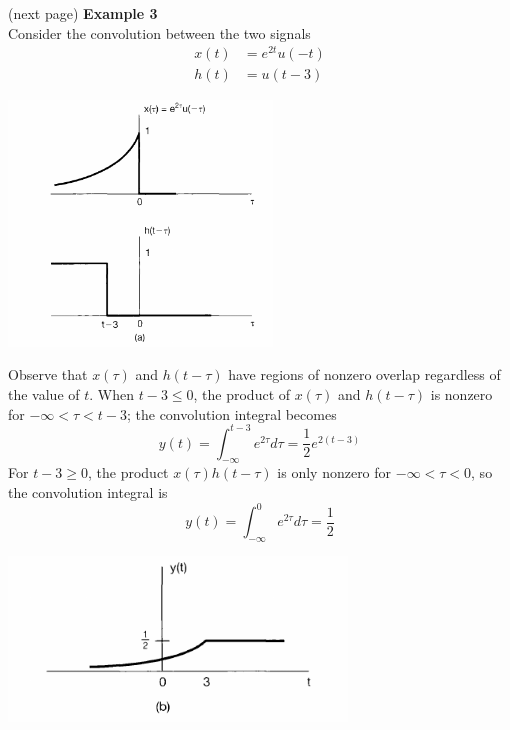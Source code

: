\documentclass{report}
\begin{document}
(next page)\newpage
\noindent\textbf{Example 3}\\
Consider the convolution between the two signals
\begin{align*}
x(t)&=e^{2t}u(-t)\\
h(t)&=u(t-3)
\end{align*}
\begin{center}
\includegraphics[width=7cm]{a41}
\end{center}
Observe that $x(\tau)$ and $h(t-\tau)$ have regions of nonzero overlap regardless of the value of $t$. 
When $t-3\leq0$, the product of $x(\tau)$ and $h(t-\tau)$ is nonzero for $-\infty<\tau<t-3$; the convolution integral becomes
\begin{equation*}
y(t)=\int^{t-3}_{-\infty}e^{2\tau}d\tau=\frac{1}{2}e^{2(t-3)}
\end{equation*}
For $t-3\geq0$, the product $x(\tau)h(t-\tau)$ is only nonzero for $-\infty<\tau<0$, so the convolution integral is
\begin{equation*}
y(t)=\int^0_{-\infty}e^{2\tau}d\tau=\frac{1}{2}
\end{equation*}
\begin{center}
\includegraphics[width=9cm]{a42}
\end{center}
\newpage
\end{document}
